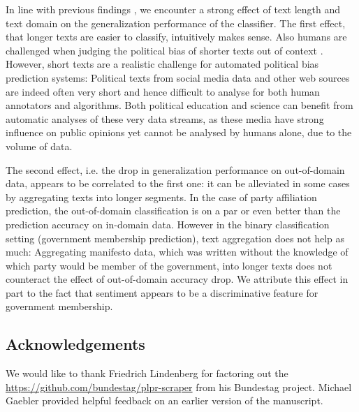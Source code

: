 \documentclass[11pt]{article}
\begin{document}
In line with previous findings \cite{Yu2008, Hirst2014}, we encounter a strong effect of text length and text domain on the generalization performance of the classifier. The first effect, that longer texts are easier to classify, intuitively makes sense. Also humans are challenged when judging the political bias of shorter texts out of context \cite{Benoit.Forthcoming}.
However, short texts are a realistic challenge for automated political bias prediction systems: Political texts from social media data and other web sources are indeed often very short and hence difficult to analyse for both human annotators and algorithms. Both political education and science can benefit from automatic analyses of these very data streams, as these media have strong influence on public opinions yet cannot be analysed by humans alone, due to the volume of data. 

The second effect, i.e. the drop in generalization performance on out-of-domain data, appears to be correlated to the first one: it can be alleviated in some cases by aggregating texts into longer segments. In the case of party affiliation prediction, the out-of-domain classification is on a par or even better than the prediction accuracy on in-domain data. However in the binary classification setting (government membership prediction), text aggregation does not help as much: Aggregating manifesto data, which was written without the knowledge of which party would be member of the government, into longer texts does not counteract the effect of out-of-domain accuracy drop. We attribute this effect in part to the fact that sentiment appears to be a discriminative feature for government membership. 

\subsection*{Acknowledgements}
We would like to thank Friedrich Lindenberg for factoring out the \url{https://github.com/bundestag/plpr-scraper} from his Bundestag project. Michael Gaebler provided helpful feedback on an earlier version of the manuscript. \\
%


\end{document}
